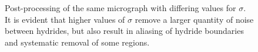 \documentclass{article}
\begin{document}
	\begin{figure}[H]
		\centering
		\hfill
		\caption{Post-processing of the same micrograph with differing values for $\sigma$. It is evident that higher values of $\sigma$ remove a larger quantity of noise between hydrides, but also result in aliasing of hydride boundaries and systematic removal of some regions.}
		\label{fig:chu1gauss}
	\end{figure}
	
\end{document}
